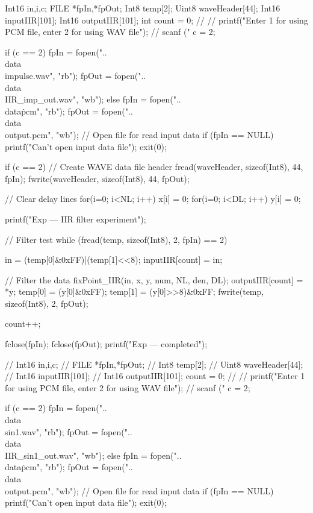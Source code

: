 \documentclass{bannerReport}
\begin{document}
\begin{code}
{	Int16  in,i,c;
	FILE   *fpIn,*fpOut;
	Int8   temp[2];
	Uint8  waveHeader[44];
	Int16 inputIIR[101];
	Int16 outputIIR[101];
	int count = 0;
//
//    printf("Enter 1 for using PCM file, enter 2 for using WAV file\n");
//    scanf ("%
	c = 2;

	if (c == 2)
	{
		fpIn = fopen("..\\data\\impulse.wav", "rb");
		fpOut = fopen("..\\data\\IIR_imp_out.wav", "wb");
	}
	else
	{
		fpIn = fopen("..\\data\.pcm", "rb");
		fpOut = fopen("..\\data\\output.pcm", "wb");
	}
	// Open file for read input data
	if (fpIn == NULL)
	{
		printf("Can't open input data file\n");
		exit(0);
	}

	if (c == 2)        // Create WAVE data file header
	{
		fread(waveHeader, sizeof(Int8), 44, fpIn);
		fwrite(waveHeader, sizeof(Int8), 44, fpOut);
	}

	// Clear delay lines
	for(i=0; i<NL; i++)
	{
		x[i] = 0;
	}
	for(i=0; i<DL; i++)
	{
		y[i] = 0;
	}

	printf("Exp --- IIR filter experiment\n");

	// Filter test
	while (fread(temp, sizeof(Int8), 2, fpIn) == 2)
	{
		in = (temp[0]&0xFF)|(temp[1]<<8);
		inputIIR[count] = in;

		// Filter the data
		fixPoint_IIR(in, x, y, num, NL, den, DL);
		outputIIR[count] = *y;
		temp[0] = (y[0]&0xFF);
		temp[1] = (y[0]>>8)&0xFF;
		fwrite(temp, sizeof(Int8), 2, fpOut);

		count++;
	}
	fclose(fpIn);
	fclose(fpOut);
	printf("Exp --- completed\n");


//    Int16  in,i,c;
//    FILE   *fpIn,*fpOut;
//    Int8   temp[2];
//    Uint8  waveHeader[44];
//    Int16 inputIIR[101];
//    Int16 outputIIR[101];
	count = 0;
//
//    printf("Enter 1 for using PCM file, enter 2 for using WAV file\n");
//    scanf ("%
	c = 2;

	if (c == 2)
	{
		fpIn = fopen("..\\data\\sin1.wav", "rb");
		fpOut = fopen("..\\data\\IIR_sin1_out.wav", "wb");
	}
	else
	{
		fpIn = fopen("..\\data\.pcm", "rb");
		fpOut = fopen("..\\data\\output.pcm", "wb");
	}
	// Open file for read input data
	if (fpIn == NULL)
	{
		printf("Can't open input data file\n");
		exit(0);
	}

}
\end{code}
\end{document}
